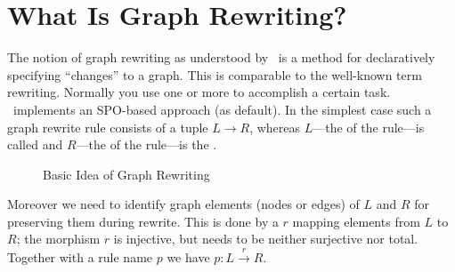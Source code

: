 \section{What Is Graph Rewriting?}
\label{ov:whatsallabout}

The notion of graph rewriting as understood by \GrG\ is a method for declaratively specifying ``changes'' to a graph.
This is comparable to the well-known term rewriting.
Normally you use one or more  to accomplish a certain task.
\GrG\ implements an SPO-based approach (as default).
In the simplest case such a graph rewrite rule consists of a tuple $L \rightarrow R$, whereas $L$---the  of the rule---is called  and $R$---the  of the rule---is the .

\begin{figure}[htbp]
	\centering
  \caption{Basic Idea of Graph Rewriting}
  \label{figrule}
\end{figure}

Moreover we need to identify graph elements (nodes or edges) of $L$ and $R$ for preserving them during rewrite.
This is done by a  $r$ mapping elements from $L$ to $R$; the morphism $r$ is injective, but needs to be neither surjective nor total.
Together with a rule name $p$ we have $p : L \xrightarrow{r} R$.

